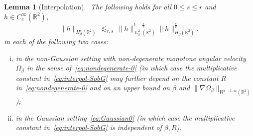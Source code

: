 \documentclass[a4paper,11pt,reqno,noindent]{amsart}
\theoremstyle{plain}
\newtheorem{lem}{Lemma}[section]
\numberwithin{equation}{section}
\newcommand{\R}{\mathbb R}
\newcommand{\3}{|\!|\!|}
\newcommand{\Ld}{\operatorname{L}}
\begin{document}
\begin{lem}[Interpolation]\label{lem:interpol-SobG}$ $
The following holds for all $0\le s\le r$ and $h\in C^\infty_c(\R^2)$,
\begin{equation}\label{eq:interpol-SobG}
\|h\|_{H^s_\beta(\R^2)}\,\lesssim_{r,s}\,\|h\|_{\Ld^2_\beta(\R^2)}^{1-\frac sr}\|h\|_{H^r_\beta(\R^2)}^{\frac sr},
\end{equation}
in each of the following two cases:
\begin{enumerate}[(i)]
\item in the non-Gaussian setting with non-degenerate monotone angular velocity $\Omega_\beta$ in the sense of~\eqref{eq:nondegenerate-0} (in which case the multiplicative constant in~\eqref{eq:interpol-SobG} may further depend on the constant $R$ in~\eqref{eq:nondegenerate-0} and on an upper bound on $\beta$ and $\|\nabla\Omega_\beta\|_{W^{r-1,\infty}(\R^2)}$);
\smallskip\item in the Gaussian setting~\eqref{eq:Gaussian0} (in which case the multiplicative constant in~\eqref{eq:interpol-SobG} is independent of $\beta,R$).
\end{enumerate}
\end{lem}
\end{document}
